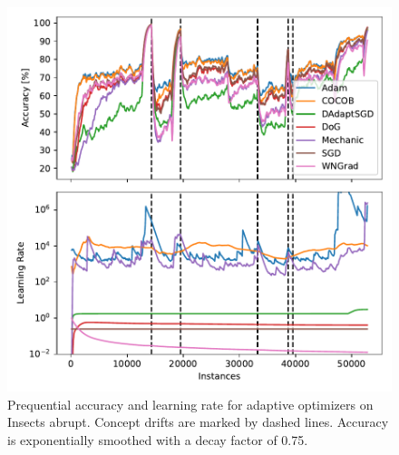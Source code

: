 \documentclass[letterpaper]{article} %
\begin{document}
\begin{figure}[h]
	\centering
	\includegraphics[width=.47\textwidth]{figures/lr_norms_optims_insects_abrupt.pdf}
	\caption{Prequential accuracy and learning rate for adaptive optimizers on Insects abrupt. Concept drifts are marked by dashed lines. Accuracy is exponentially smoothed with a decay factor of 0.75.}
	\label{fig:prequential_optims_insects}
\end{figure}
\end{document}
